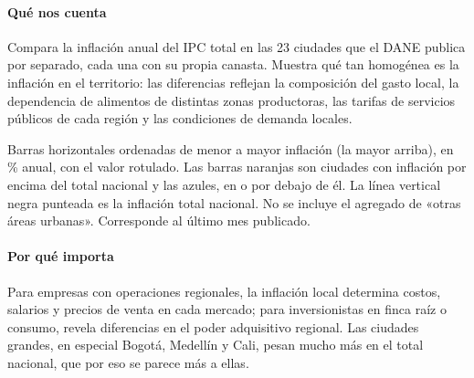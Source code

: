 \paragraph{Qué nos cuenta}
Compara la inflación anual del IPC total en las 23 ciudades que el DANE publica por separado, cada una con su propia canasta. Muestra qué tan homogénea es la inflación en el territorio: las diferencias reflejan la composición del gasto local, la dependencia de alimentos de distintas zonas productoras, las tarifas de servicios públicos de cada región y las condiciones de demanda locales.

\begin{leer}
Barras horizontales ordenadas de menor a mayor inflación (la mayor arriba), en \% anual, con el valor rotulado. Las barras naranjas son ciudades con inflación por encima del total nacional y las azules, en o por debajo de él. La línea vertical negra punteada es la inflación total nacional. No se incluye el agregado de «otras áreas urbanas». Corresponde al último mes publicado.
\end{leer}

\paragraph{Por qué importa}
Para empresas con operaciones regionales, la inflación local determina costos, salarios y precios de venta en cada mercado; para inversionistas en finca raíz o consumo, revela diferencias en el poder adquisitivo regional. Las ciudades grandes, en especial Bogotá, Medellín y Cali, pesan mucho más en el total nacional, que por eso se parece más a ellas.

